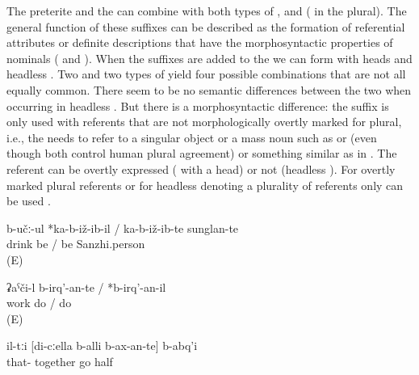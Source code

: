The preterite and the  can combine with both types of ,  and  ( in the plural). The general function of these suffixes can be described as the formation of referential attributes or definite descriptions that have the morphosyntactic properties of nominals ( and ). When the suffixes are added to the  we can form  with heads and headless . Two  and two types of  yield four possible combinations that are not all equally common. There seem to be no semantic differences between the two  when occurring in headless . But there is a morphosyntactic difference: the suffix  is only used with referents that are not morphologically overtly marked for plural, i.e., the  needs to refer to a singular object or a mass noun such as   or   (even though both  control human plural agreement) or something similar as in . The referent can be overtly expressed ( with a head) or not (headless ). For overtly marked plural referents or for headless  denoting a plurality of referents only  can be used .
%
\begin{exe}
	\ex	\label{ex:the Sanzhi people who are sitting and drinking}
	\gll	b-učː-ul	*ka-b-iž-ib-il	/	ka-b-iž-ib-te	sunglan-te\\
		drink	be 	/	be	Sanzhi.person\\
	\glt	{} (E)

	\ex	\label{ex:the ones who are working PTCP}
	\gll	ʡaˁči-l	b-irq'-an-te	/	*b-irq'-an-il\\
		work	do	/	do\\
	\glt	{} (E)
	
		\ex	\label{ex:the half (of the people) who were going with me}
	\gll	il-tːi	[di-cːella	b-alli	b-ax-an-te]	b-abq'i\\
		that-		together	go 	half\\
	\glt	{}
\end{exe}


